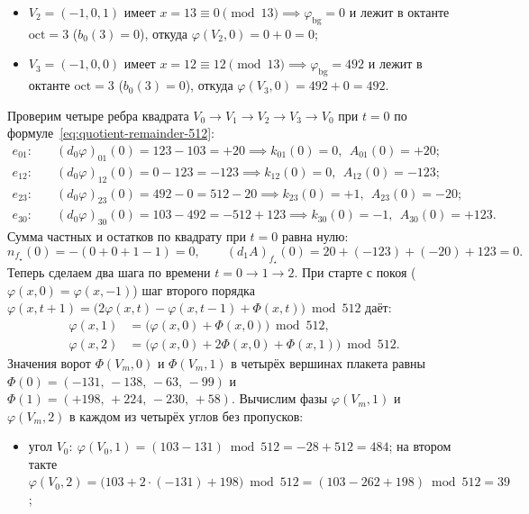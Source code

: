 \begin{corollary}[Единство природы и количества заряда: частное и остаток одного деления на $\phaseRingCount = 512$]
\begin{enumerate}[label=(\roman*)]
\begin{enumerate}[label=(\alph*),nosep]
\begin{itemize}[nosep,leftmargin=*]
    \item $V_2=(-1,0,1)$ имеет $x=13 \equiv 0\pmod{13} \implies \varphi_{\mathrm{bg}} = 0$ и лежит в октанте $\mathrm{oct}=3$ ($b_0(3)=0$), откуда $\varphi(V_2,0) = 0 + 0 = 0$;
    \item $V_3=(-1,0,0)$ имеет $x=12 \equiv 12\pmod{13} \implies \varphi_{\mathrm{bg}} = 492$ и лежит в октанте $\mathrm{oct}=3$ ($b_0(3)=0$), откуда $\varphi(V_3,0) = 492 + 0 = 492$.
    \end{itemize}
    Проверим четыре ребра квадрата $V_0\to V_1\to V_2\to V_3\to V_0$ при $t=0$ по формуле~\eqref{eq:quotient-remainder-512}:
    \begin{align*}
      e_{01}\colon &\quad (d_0\varphi)_{01}(0) = 123 - 103 = +20 \implies k_{01}(0)=0,\ \ A_{01}(0)=+20;\\
      e_{12}\colon &\quad (d_0\varphi)_{12}(0) = 0 - 123 = -123 \implies k_{12}(0)=0,\ \ A_{12}(0)=-123;\\
      e_{23}\colon &\quad (d_0\varphi)_{23}(0) = 492 - 0 = 512 - 20 \implies k_{23}(0)=+1,\ \ A_{23}(0)=-20;\\
      e_{30}\colon &\quad (d_0\varphi)_{30}(0) = 103 - 492 = -512 + 123 \implies k_{30}(0)=-1,\ \ A_{30}(0)=+123.
    \end{align*}
    Сумма частных и остатков по квадрату при $t=0$ равна нулю:
    \[
      n_{f_\star}(0) = -(0 + 0 + 1 - 1) = 0,
      \qquad
      (d_1 A)_{f_\star}(0) = 20 + (-123) + (-20) + 123 = 0.
    \]
    Теперь сделаем два шага по времени $t=0\to 1\to 2$.
    При старте с покоя ($\varphi(x,0)=\varphi(x,-1)$) шаг второго порядка $\varphi(x,t+1) = \bigl(2\varphi(x,t) - \varphi(x,t-1) + \Phi(x,t)\bigr)\bmod 512$ даёт:
    \begin{align*}
      \varphi(x,1) &= \bigl(\varphi(x,0) + \Phi(x,0)\bigr)\bmod 512,\\
      \varphi(x,2) &= \bigl(\varphi(x,0) + 2\Phi(x,0) + \Phi(x,1)\bigr)\bmod 512.
    \end{align*}
    Значения ворот $\Phi(V_m,0)$ и $\Phi(V_m,1)$ в четырёх вершинах плакета равны $\Phi(0) = (-131,\,-138,\,-63,\,-99)$ и $\Phi(1) = (+198,\,+224,\,-230,\,+58)$.
    Вычислим фазы $\varphi(V_m,1)$ и $\varphi(V_m,2)$ в каждом из четырёх углов без пропусков:
    \begin{itemize}[nosep,leftmargin=*]
    \item угол $V_0\colon\ \varphi(V_0,1) = (103 - 131)\bmod 512 = -28 + 512 = 484$;
      на втором такте $\varphi(V_0,2) = \bigl(103 + 2\cdot(-131) + 198\bigr)\bmod 512 = (103 - 262 + 198)\bmod 512 = 39$;

\end{itemize}
\end{enumerate}
\end{enumerate}
\end{corollary}
